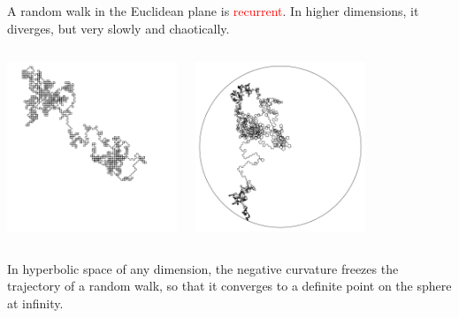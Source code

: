 \documentclass{beamer}
\begin{document}
\frame
{
A random walk in the Euclidean plane is \textcolor{red}{recurrent}. In higher dimensions, it diverges, but
very slowly and chaotically.
\begin{columns}[c]
\column{2in}
\begin{center}
\includegraphics[width=2in]{turtle_Euclid.png}
\end{center}
\column{2in}
\begin{center}
\includegraphics[width=2in]{turtle_hyperbolic.png}
\end{center}
\end{columns}
In hyperbolic space of any dimension, the negative curvature \textcolor{dgreen}{freezes} 
the trajectory of a random walk, so that it converges to a definite point on the sphere
at infinity.
}
\frame
\end{document}

